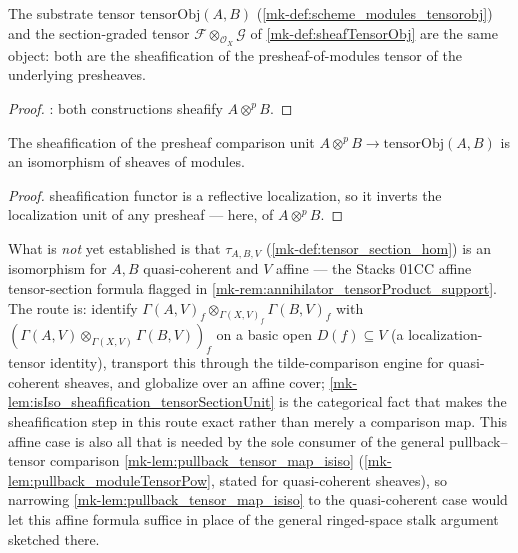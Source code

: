 \begin{lemma}\label{mk-lem:tensorObj_iso_sheafTensorObj}
  \leanok

  The substrate tensor \(\mathrm{tensorObj}(A,B)\)
  (\ref{mk-def:scheme_modules_tensorobj}) and the section-graded tensor
  \(\mathcal F \otimes_{\mathcal O_X} \mathcal G\) of \ref{mk-def:sheafTensorObj}
  are the same object: both are the sheafification of the presheaf-of-modules
  tensor of the underlying presheaves.
\end{lemma}
\begin{proof}
  \leanokDefinitional: both constructions sheafify \(A \otimes^p B\).
\end{proof}

\begin{lemma}\label{mk-lem:isIso_sheafification_tensorSectionUnit}
  \leanok

  The sheafification of the presheaf comparison unit
  \(A \otimes^p B \to \mathrm{tensorObj}(A,B)\) is an isomorphism of sheaves
  of modules.
\end{lemma}
\begin{proof}
  \leanokThe sheafification functor is a reflective localization, so it inverts the
  localization unit of any presheaf --- here, of \(A \otimes^p B\).
\end{proof}

\begin{remark}
  \label{mk-rem:tensor_section_formula_gap}
  What is \emph{not} yet established is that \(\tau_{A,B,V}\)
  (\ref{mk-def:tensor_section_hom}) is an isomorphism for \(A, B\)
  quasi-coherent and \(V\) affine --- the Stacks 01CC affine tensor-section
  formula flagged in \ref{mk-rem:annihilator_tensorProduct_support}. The route
  is: identify \(\Gamma(A,V)_f \otimes_{\Gamma(X,V)_f} \Gamma(B,V)_f\) with
  \((\Gamma(A,V) \otimes_{\Gamma(X,V)} \Gamma(B,V))_f\) on a basic open
  \(D(f) \subseteq V\) (a localization-tensor identity), transport this
  through the tilde-comparison engine for quasi-coherent sheaves, and
  globalize over an affine cover; \ref{mk-lem:isIso_sheafification_tensorSectionUnit}
  is the categorical fact that makes the sheafification step in this route
  exact rather than merely a comparison map. This affine case is also all
  that is needed by the sole consumer of the general pullback--tensor
  comparison \ref{mk-lem:pullback_tensor_map_isiso}
  (\ref{mk-lem:pullback_moduleTensorPow}, stated for quasi-coherent sheaves),
  so narrowing \ref{mk-lem:pullback_tensor_map_isiso} to the quasi-coherent
  case would let this affine formula suffice in place of the general
  ringed-space stalk argument sketched there.
\end{remark}

